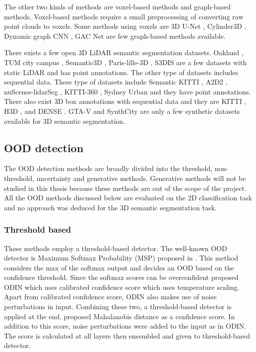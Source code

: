 \documentclass[thesis]{mas_proposal}
\begin{document}
The other two kinds of methods are voxel-based methods and graph-based methods. 
Voxel-based methods require a small preprocessing of converting raw point clouds to voxels.
Some methods using voxels are 3D U-Net \cite{3Dmininet}, Cylinder3D \cite{zhou2020cylinder3d}. 
Dynamic graph CNN \cite{dyn_graph_cnn}, GAC Net \cite{Wang_2019_CVPR_GACNet} are few graph-based methods available.

There exists a few open 3D LiDAR semantic segmentation datasets. 
Oakland \cite{oakland}, TUM city campus \cite{gehrung2017approach_tum_campus}, Semantic3D \cite{hackel2017semantic3d}, Paris-lille-3D \cite{roynard2018paris}, S3DIS \cite{Armeni_2016_CVPR_S3DIS} are a few datasets with static LiDAR and has point annotations.
The other type of datasets includes sequential data.
These type of datasets include Semantic KITTI \cite{Behley_2019_ICCV}, A2D2 \cite{geyer2020a2d2}, nuScenes-lidarSeg \cite{caesar2020nuscenes}, KITTI-360 \cite{Xie_2016_CVPR_KITTI_360}, Sydney Urban \cite{de2013unsupervised} and they have point annotations.
There also exist 3D box annotations with sequential data and they are KITTI \cite{KITTI}, H3D \cite{H3D}, and DENSE \cite{Bijelic_2020_CVPR_DENSE}. %
GTA-V \cite{GTAV} and SynthCity \cite{griffiths2019synthcity} are only a few synthetic datasets available for 3D semantic segmentation.

\subsection{OOD detection}
The OOD detection methods are broadly divided into the threshold, non-threshold, uncertainty and generative methods.
Generative methods will not be studied in this thesis because these methods are out of the scope of the project.
All the OOD methods discussed below are evaluated on the 2D classification task and no approach was deduced for the 3D semantic segmentation task.
\subsubsection{Threshold based}
These methods employ a threshold-based detector.
The well-known OOD detector is Maximum Softmax Probability (MSP) proposed in \cite{hendrycks2016baseline_MSP}. 
This method considers the max of the softmax output and decides an OOD based on the confidence threshold.
Since the softmax scores can be overconfident \cite{liang2017enhancing_ODIN} proposed ODIN which uses calibrated confidence score which uses temperature scaling.
Apart from calibrated confidence score, ODIN also makes use of noise perturbations in input.
Combining these two, a threshold-based detector is applied at the end. 
\cite{lee2018simple_mahalanobis} proposed Mahalanobis distance as a confidence score. 
In addition to this score, noise perturbations were added to the input as in ODIN. 
The score is calculated at all layers then ensembled and given to threshold-based detector.
\end{document}
